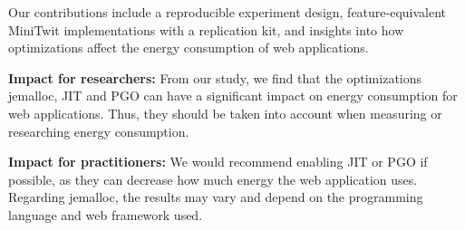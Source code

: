 \documentclass[main.tex]{subfiles}
\begin{document}
Our contributions include a reproducible experiment design, feature-equivalent MiniTwit implementations with a replication kit, and insights into how optimizations affect the energy consumption of web applications.

\textbf{Impact for researchers:} From our study, we find that the optimizations jemalloc, JIT and PGO can have a significant impact on energy consumption for web applications. Thus, they should be taken into account when measuring or researching energy consumption. 

\textbf{Impact for practitioners:} We would recommend enabling JIT or PGO if possible, as they can decrease how much energy the web application uses. Regarding jemalloc, the results may vary and depend on the programming language and web framework used.
\end{document}

